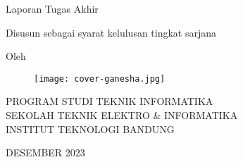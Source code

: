 \clearpage
\pagestyle{empty}

\begin{center}
  \smallskip

  \Large \bfseries \MakeUppercase{\thetitle}
  \vfill

  \Large Laporan Tugas Akhir
  \vfill

  \large Disusun sebagai syarat kelulusan tingkat sarjana
  \vfill

  \large Oleh

  \Large \theauthor

  \vfill
  \begin{figure}[!h]
    \centering
    \texttt{[image: cover-ganesha.jpg]}
  \end{figure}
  \vfill

  \large
  \uppercase{
    Program Studi Teknik Informatika \\
    Sekolah Teknik Elektro \& Informatika \\
    Institut Teknologi Bandung
  }

  {{DESEMBER}} {{2023}}

\end{center}

\clearpage
